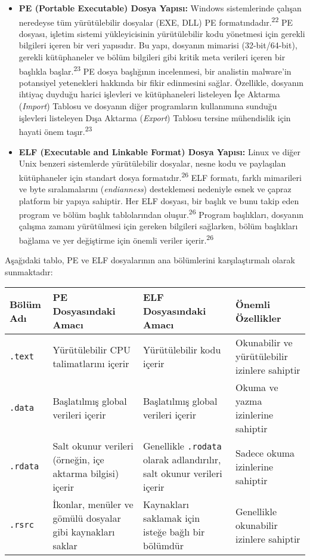 \begin{itemize}
    \item \textbf{PE (Portable Executable) Dosya Yapısı:} Windows sistemlerinde çalışan neredeyse tüm yürütülebilir dosyalar (EXE, DLL) PE formatındadır.\textsuperscript{22} PE dosyası, işletim sistemi yükleyicisinin yürütülebilir kodu yönetmesi için gerekli bilgileri içeren bir veri yapısıdır. Bu yapı, dosyanın mimarisi (32-bit/64-bit), gerekli kütüphaneler ve bölüm bilgileri gibi kritik meta verileri içeren bir başlıkla başlar.\textsuperscript{23} PE dosya başlığının incelenmesi, bir analistin malware'in potansiyel yetenekleri hakkında bir fikir edinmesini sağlar. Özellikle, dosyanın ihtiyaç duyduğu harici işlevleri ve kütüphaneleri listeleyen İçe Aktarma (\textit{Import}) Tablosu ve dosyanın diğer programların kullanımına sunduğu işlevleri listeleyen Dışa Aktarma (\textit{Export}) Tablosu tersine mühendislik için hayati önem taşır.\textsuperscript{23}
    \item \textbf{ELF (Executable and Linkable Format) Dosya Yapısı:} Linux ve diğer Unix benzeri sistemlerde yürütülebilir dosyalar, nesne kodu ve paylaşılan kütüphaneler için standart dosya formatıdır.\textsuperscript{26} ELF formatı, farklı mimarileri ve byte sıralamalarını (\textit{endianness}) desteklemesi nedeniyle esnek ve çapraz platform bir yapıya sahiptir. Her ELF dosyası, bir başlık ve bunu takip eden program ve bölüm başlık tablolarından oluşur.\textsuperscript{26} Program başlıkları, dosyanın çalışma zamanı yürütülmesi için gereken bilgileri sağlarken, bölüm başlıkları bağlama ve yer değiştirme için önemli veriler içerir.\textsuperscript{26}
\end{itemize}

Aşağıdaki tablo, PE ve ELF dosyalarının ana bölümlerini karşılaştırmalı olarak sunmaktadır:

\begin{longtable}{|l|p{4cm}|p{4cm}|p{4cm}|}
\hline
\textbf{Bölüm Adı} & \textbf{PE Dosyasındaki Amacı} & \textbf{ELF Dosyasındaki Amacı} & \textbf{Önemli Özellikler} \\
\hline
\texttt{.text} & Yürütülebilir CPU talimatlarını içerir & Yürütülebilir kodu içerir & Okunabilir ve yürütülebilir izinlere sahiptir \\
\hline
\texttt{.data} & Başlatılmış global verileri içerir & Başlatılmış global verileri içerir & Okuma ve yazma izinlerine sahiptir \\
\hline
\texttt{.rdata} & Salt okunur verileri (örneğin, içe aktarma bilgisi) içerir & Genellikle \texttt{.rodata} olarak adlandırılır, salt okunur verileri içerir & Sadece okuma izinlerine sahiptir \\
\hline
\texttt{.rsrc} & İkonlar, menüler ve gömülü dosyalar gibi kaynakları saklar & Kaynakları saklamak için isteğe bağlı bir bölümdür & Genellikle okunabilir izinlere sahiptir \\
\hline
\end{longtable}


